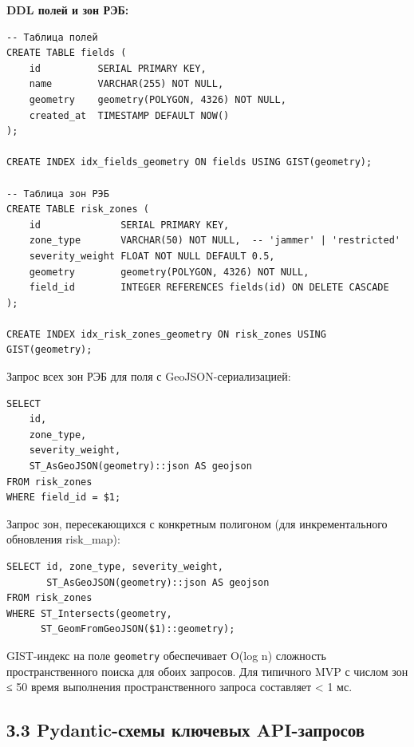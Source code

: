 \documentclass[14pt,a4paper]{extarticle}
\begin{document}
\textbf{DDL полей и зон РЭБ:}

\begin{verbatim}
-- Таблица полей
CREATE TABLE fields (
    id          SERIAL PRIMARY KEY,
    name        VARCHAR(255) NOT NULL,
    geometry    geometry(POLYGON, 4326) NOT NULL,
    created_at  TIMESTAMP DEFAULT NOW()
);

CREATE INDEX idx_fields_geometry ON fields USING GIST(geometry);

-- Таблица зон РЭБ
CREATE TABLE risk_zones (
    id              SERIAL PRIMARY KEY,
    zone_type       VARCHAR(50) NOT NULL,  -- 'jammer' | 'restricted'
    severity_weight FLOAT NOT NULL DEFAULT 0.5,
    geometry        geometry(POLYGON, 4326) NOT NULL,
    field_id        INTEGER REFERENCES fields(id) ON DELETE CASCADE
);

CREATE INDEX idx_risk_zones_geometry ON risk_zones USING GIST(geometry);
\end{verbatim}

Запрос всех зон РЭБ для поля с GeoJSON-сериализацией:

\begin{verbatim}
SELECT
    id,
    zone_type,
    severity_weight,
    ST_AsGeoJSON(geometry)::json AS geojson
FROM risk_zones
WHERE field_id = $1;
\end{verbatim}

Запрос зон, пересекающихся с конкретным полигоном (для инкрементального обновления risk\_map):

\begin{verbatim}
SELECT id, zone_type, severity_weight,
       ST_AsGeoJSON(geometry)::json AS geojson
FROM risk_zones
WHERE ST_Intersects(geometry,
      ST_GeomFromGeoJSON($1)::geometry);
\end{verbatim}

GIST-индекс на поле \texttt{geometry} обеспечивает O(log n) сложность пространственного поиска для обоих запросов. Для типичного MVP с числом зон ≤ 50 время выполнения пространственного запроса составляет \textless{} 1 мс.

\hypertarget{ux437.3-pydantic-ux441ux445ux435ux43cux44b-ux43aux43bux44eux447ux435ux432ux44bux445-api-ux437ux430ux43fux440ux43eux441ux43eux432}{%
\subsection{З.3 Pydantic-схемы ключевых API-запросов}\label{ux437.3-pydantic-ux441ux445ux435ux43cux44b-ux43aux43bux44eux447ux435ux432ux44bux445-api-ux437ux430ux43fux440ux43eux441ux43eux432}}
\end{document}
